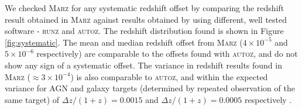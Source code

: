 \documentclass[iop]{emulateapj}
\newcommand{\runz}{\textsc{runz}}
\newcommand{\autoz}{\textsc{autoz}}
\newcommand{\marz}{\textsc{Marz}}
\begin{document}
We checked \marz{} for any systematic redshift offset by comparing the redshift result obtained in \marz{} against results obtained by using different, well tested software - \runz{} and \autoz{}. The redshift distribution found is shown in Figure \ref{fig:systematic}. The mean and median redshift offset from \marz{} ($4\times10^{-5}$ and $5\times10^{-6}$ respectively) are comparable to the offsets found with \autoz{}, and do not show any sign of a systematic offset. The variance in redshift results found in \marz{} ($\approx 3 \times 10^{-4}$) is also comparable to \autoz{}, and within the expected variance for AGN and galaxy targets (determined by repeated observation of the same target) of $\Delta z/(1+z) = 0.0015$ and $\Delta z/(1+z) = 0.0005$ respectively \citep{fang2015}.\\
\end{document}
